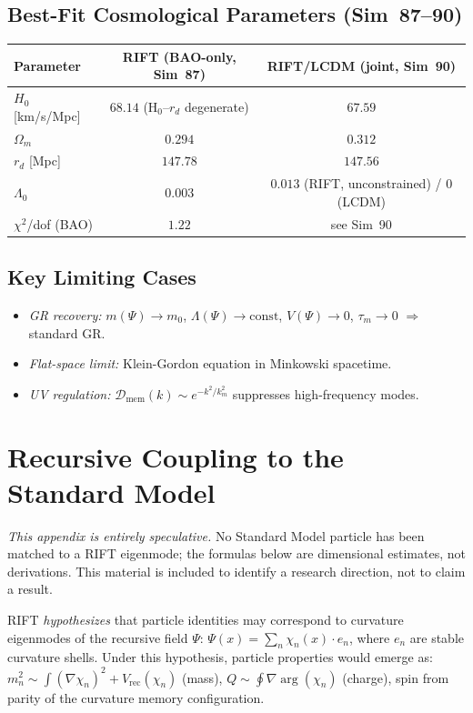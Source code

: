 \documentclass[12pt,a4paper]{article}
\begin{document}
\subsection{Best-Fit Cosmological Parameters (Sim~87--90)}

\begin{center}
\begin{tabular}{lcc}
\toprule
Parameter & RIFT (BAO-only, Sim~87) & RIFT/LCDM (joint, Sim~90) \\
\midrule
$H_0$ [km/s/Mpc] & $68.14$ (H$_0$--$r_d$ degenerate) & $67.59$ \\
$\Omega_m$ & $0.294$ & $0.312$ \\
$r_d$ [Mpc] & $147.78$ & $147.56$ \\
$\Lambda_0$ & $0.003$ & $0.013$ (RIFT, unconstrained) / 0 (LCDM) \\
$\chi^2$/dof (BAO) & $1.22$ & see Sim~90 \\
\bottomrule
\end{tabular}
\end{center}

\subsection{Key Limiting Cases}

\begin{itemize}
  \item \emph{GR recovery:} $m(\Psi)\to m_0$, $\Lambda(\Psi)\to\mathrm{const}$, $V(\Psi)\to 0$, $\tau_m\to 0$ $\Rightarrow$ standard GR.
  \item \emph{Flat-space limit:} Klein-Gordon equation in Minkowski spacetime.
  \item \emph{UV regulation:} $\mathcal{D}_{\mathrm{mem}}(k) \sim e^{-k^2/k_m^2}$ suppresses high-frequency modes.
\end{itemize}

\section{Recursive Coupling to the Standard Model}
\label{app:SM}

\emph{This appendix is entirely speculative.}  No Standard Model particle has
been matched to a RIFT eigenmode; the formulas below are dimensional estimates,
not derivations.  This material is included to identify a research direction,
not to claim a result.

RIFT \emph{hypothesizes} that particle identities may correspond to curvature
eigenmodes of the recursive field $\Psi$:
$\Psi(x) = \sum_n \chi_n(x)\cdot e_n$,
where $e_n$ are stable curvature shells. Under this hypothesis, particle
properties would emerge as:
$m_n^2 \sim \int (\nabla\chi_n)^2 + V_{\mathrm{rec}}(\chi_n)$ (mass),
$Q \sim \oint \nabla\arg(\chi_n)$ (charge),
spin from parity of the curvature memory configuration.
\end{document}
